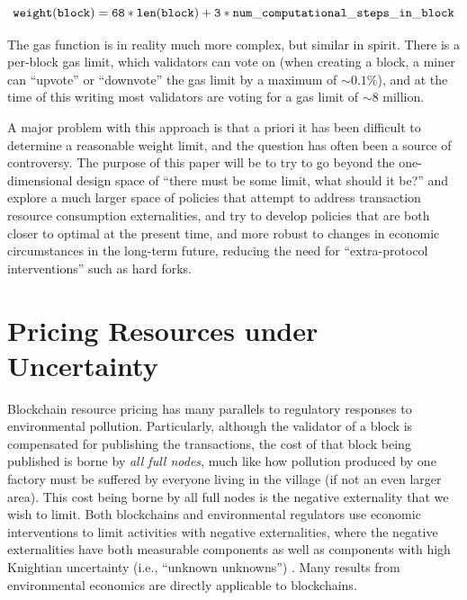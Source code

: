 \documentclass[12pt, final]{article}
\begin{document}
\begin{footnotesize}
\begin{equation}
\tt{weight(block) = 68 * len(block) + 3 * num\_computational\_steps\_in\_block}
\end{equation}
\end{footnotesize}

The gas function is in reality much more complex, but similar in spirit. There is a per-block gas limit, which validators can vote on (when creating a block, a miner can ``upvote'' or ``downvote'' the gas limit by a maximum of $\sim\!0.1\%$), and at the time of this writing most validators are voting for a gas limit of $\sim \! 8$ million.

A major problem with this approach is that a priori it has been difficult to determine a reasonable weight limit, and the question has often been a source of controversy\cite{blocksizedebate}. The purpose of this paper will be to try to go beyond the one-dimensional design space of ``there must be some limit, what should it be?'' and explore a much larger space of policies that attempt to address transaction resource consumption externalities, and try to develop policies that are both closer to optimal at the present time, and more robust to changes in economic circumstances in the long-term future, reducing the need for ``extra-protocol interventions'' such as hard forks.

\section{Pricing Resources under Uncertainty}
\label{sect:uncertainty}
Blockchain resource pricing has many parallels to regulatory responses to environmental pollution.  Particularly, although the validator of a block is compensated for publishing the transactions, the cost of that block being published is borne by \emph{all full nodes}, much like how pollution produced by one factory must be suffered by everyone living in the village (if not an even larger area).  This cost being borne by all full nodes is the negative externality that we wish to limit.  Both blockchains and environmental regulators use economic interventions to limit activities with negative externalities, where the negative externalities have both measurable components as well as components with high Knightian uncertainty (i.e., ``unknown unknowns'') \cite{knight1921risk}.  Many results from environmental economics \cite{barder14} are directly applicable to blockchains.
\end{document}
